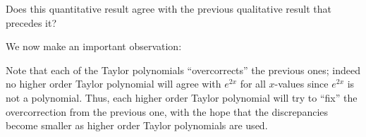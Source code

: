 \documentclass{ximera}
\begin{document}
\begin{exercise}
\begin{exercise}
\begin{exercise}
Does this quantitative result agree with the previous qualitative result that precedes it?
\begin{multipleChoice}
\end{multipleChoice}

We now make an important observation:

\begin{remark}
Note that each of the Taylor polynomials ``overcorrects'' the previous ones; indeed no higher order Taylor polynomial will agree with $e^{2x}$ for all $x$-values since $e^{2x}$ is not a polynomial.  Thus, each higher order Taylor polynomial will try to ``fix'' the overcorrection from the previous one, with the hope that the discrepancies become smaller as higher order Taylor polynomials are used.
\end{remark}

\end{exercise}
\end{exercise}
\end{exercise}
\end{document}
